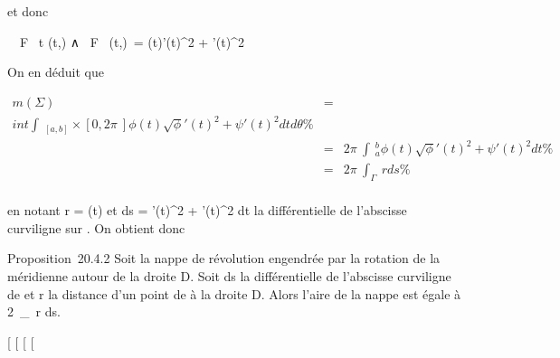 \documentclass[]{article}
\begin{document}
et donc

\ \partial~F \over \partial~t (t,\theta) ∧ \partial~F
\over \partial~\theta (t,\theta)\ =
\phi(t)\sqrt\phi'(t)^2  +
\psi'(t)^2

On en déduit que

\begin{align*} m(\Sigma)& =& \\int
 \int ~
_[a,b]\times[0,2\pi~]\phi(t)\sqrt\phi'(t)^2
 + \psi'(t)^2 dt d\theta\%& \\ &
=& 2\pi~\int ~
_a^b\phi(t)\sqrt\phi'(t)^2
 + \psi'(t)^2 dt \%& \\ &
=& 2\pi~\int  _\Gamma~r ds
\%& \\ \end{align*}

en notant r = \phi(t) et ds = \sqrt\phi'(t)^2  +
\psi'(t)^2 dt la différentielle de l'abscisse curviligne sur
\Gamma. On obtient donc

Proposition~20.4.2 Soit \Sigma la nappe de révolution engendrée par la
rotation de la méridienne \Gamma autour de la droite D. Soit ds la
différentielle de l'abscisse curviligne de \Gamma et r la distance d'un point
de \Gamma à la droite D. Alors l'aire de la nappe est égale à
2\pi~\int  _\Gamma~r ds.

[
[
[
[
\end{document}
